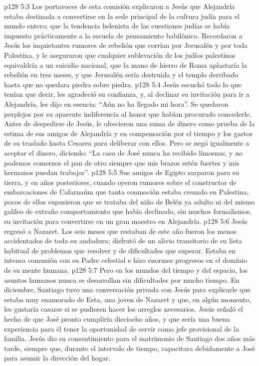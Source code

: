 \vs p128 5:3 Los portavoces de esta comisión explicaron a Jesús que Alejandría estaba destinada a convertirse en la sede principal de la cultura judía para el mundo entero; que la tendencia helenista de las cuestiones judías se había impuesto prácticamente a la escuela de pensamiento babilónico. Recordaron a Jesús los inquietantes rumores de rebelión que corrían por Jerusalén y por toda Palestina, y le aseguraron que cualquier sublevación de los judíos palestinos equivaldría a un suicidio nacional, que la mano de hierro de Roma aplastaría la rebelión en tres meses, y que Jerusalén sería destruida y el templo derribado hasta que no quedara piedra sobre piedra.
\vs p128 5:4 Jesús escuchó todo lo que tenían que decir, les agradeció su confianza, y, al declinar su invitación para ir a Alejandría, les dijo en esencia: “Aún no ha llegado mi hora”. Se quedaron perplejos por su aparente indiferencia al honor que habían procurado concederle. Antes de despedirse de Jesús, le ofrecieron una suma de dinero como prueba de la estima de sus amigos de Alejandría y en compensación por el tiempo y los gastos de su traslado hasta Cesarea para deliberar con ellos. Pero se negó igualmente a aceptar el dinero, diciendo: “La casa de José nunca ha recibido limosnas, y no podemos comernos el pan de otro siempre que mis brazos estén fuertes y mis hermanos puedan trabajar”.
\vs p128 5:5 Sus amigos de Egipto zarparon para su tierra, y en años posteriores, cuando oyeron rumores sobre el constructor de embarcaciones de Cafarnaúm que tanta conmoción estaba creando en Palestina, pocos de ellos supusieron que se trataba del niño de Belén ya adulto ni del mismo galileo de extraño comportamiento que había declinado, sin muchos formalismos, su invitación para convertirse en un gran maestro en Alejandría.
\vs p128 5:6 \pc Jesús regresó a Nazaret. Los seis meses que restaban de este año fueron los menos accidentados de toda su andadura; disfrutó de un alivio transitorio de su lista habitual de problemas que resolver y de dificultades que superar. Estaba en intensa comunión con su Padre celestial e hizo enormes progresos en el dominio de su mente humana.
\vs p128 5:7 Pero en los mundos del tiempo y del espacio, los asuntos humanos nunca se desarrollan sin dificultades por mucho tiempo. En diciembre, Santiago tuvo una conversación privada con Jesús para explicarle que estaba muy enamorado de Esta, una joven de Nazaret y que, en algún momento, les gustaría casarse si se pudiesen hacer los arreglos necesarios. Jesús señaló el hecho de que José pronto cumpliría dieciocho años, y que sería una buena experiencia para él tener la oportunidad de servir como jefe provisional de la familia. Jesús dio su consentimiento para el matrimonio de Santiago dos años más tarde, siempre que, durante el intervalo de tiempo, capacitara debidamente a José para asumir la dirección del hogar.
